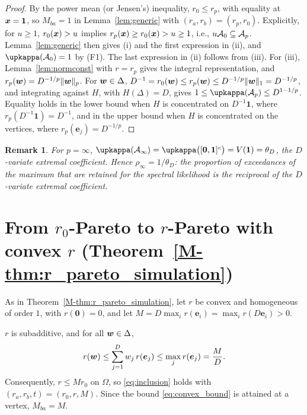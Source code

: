 \documentclass[12pt]{article}
\let\amsfrac\frac
\let\frac\amsfrac
\newtheorem{remark}{Remark}
\newcommand{\one}{\bm 1}
\begin{document}
\begin{proof}
By the power mean (or Jensen's) inequality, $r_0\leq r_p$, with equality at $\bx=\one$, so $M_{ba}=1$ in Lemma~\ref{lem:generic} with $(r_a,r_b)=(r_p,r_0)$. Explicitly, for $u\geq1$, $r_0({\boldsymbol{x}})>u$ implies $r_p({\boldsymbol{x}})\geq r_0({\boldsymbol{x}})>u\geq1$, i.e., $u{\mathcal A}_0\subseteq{\mathcal A}_p$. Lemma~\ref{lem:generic} then gives (i) and the first expression in (ii), and $\upkappa(\calA_0)=1$ by (F1). The last expression in (ii) follows from (iii).
For (iii), Lemma~\ref{lem:normconst} with $r=r_p$ gives the integral representation, and $r_p({\boldsymbol{w}})=D^{-1/p}\|{\boldsymbol{w}}\|_p$. For ${\boldsymbol{w}}\in\Delta$, $D^{-1}=r_0({\boldsymbol{w}})\leq r_p({\boldsymbol{w}})\leq D^{-1/p}\|{\boldsymbol{w}}\|_1=D^{-1/p}$, and integrating against $H$, with $H(\Delta)=D$, gives $1\leq\upkappa(\calA_p)\leq D^{1-1/p}$. Equality holds in the lower bound when $H$ is concentrated on $D^{-1}\one$, where $r_p(D^{-1}\one)=D^{-1}$, and in the upper bound when $H$ is concentrated on the vertices, where $r_p(\bm e_j)=D^{-1/p}$.
\end{proof}

\begin{remark}\label{rem:pinf}
For $p=\infty$, $\upkappa(\calA_\infty)=\upkappa\big([\bm 0,\one]^c\big)=V(\one)=\theta_D$, the $D$-variate extremal coefficient. Hence $\rho_\infty=1/\theta_D$: the proportion of exceedances of the maximum that are retained for the spectral likelihood is the reciprocal of the $D$-variate extremal coefficient.
\end{remark}

\section{From $r_0$-Pareto to $r$-Pareto with convex $r$ (Theorem~\ref{M-thm:r_pareto_simulation})}

As in Theorem~\ref{M-thm:r_pareto_simulation}, let $r$ be convex and homogeneous of order $1$, with $r(\bm 0)=0$, and let $M=D\max_{i}r(\bm e_i)=\max_ir(D\bm e_i)>0$.

\begin{lemma}\label{lem:convex}
$r$ is subadditive, and for all ${\boldsymbol{w}}\in\Delta$,
\begin{equation}\label{eq:convex_bound}
r(\bw)\leq\sum_{j=1}^D w_j\,r(\bm e_j)\leq\max_j r(\bm e_j)=\frac{M}{D}.
\end{equation}
Consequently, $r\leq Mr_0$ on $\Omega$, so \eqref{eq:inclusion} holds with $(r_a,r_b,t)=(r_0,r,M)$. Since the bound \eqref{eq:convex_bound} is attained at a vertex, $M_{ba}=M$.
\end{lemma}
\end{document}
